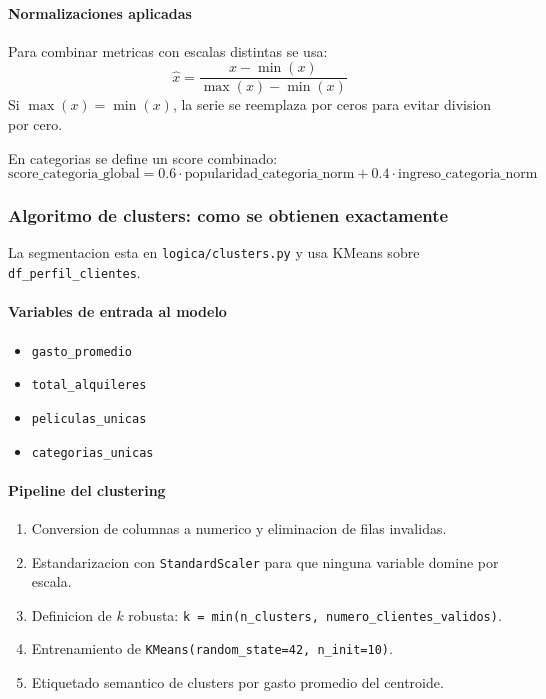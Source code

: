 ﻿\documentclass{article}
\begin{document}
\paragraph{Normalizaciones aplicadas}
Para combinar metricas con escalas distintas se usa:
\[
\hat{x}=\frac{x-\min(x)}{\max(x)-\min(x)}
\]
Si \(\max(x)=\min(x)\), la serie se reemplaza por ceros para evitar division por cero.

En categorias se define un score combinado:
\[
\text{score\_categoria\_global}=0.6\cdot\text{popularidad\_categoria\_norm}+0.4\cdot\text{ingreso\_categoria\_norm}
\]

\subsubsection{Algoritmo de clusters: como se obtienen exactamente}
La segmentacion esta en \texttt{logica/clusters.py} y usa KMeans sobre \texttt{df\_perfil\_clientes}.

\paragraph{Variables de entrada al modelo}
\begin{itemize}
    \item \texttt{gasto\_promedio}
    \item \texttt{total\_alquileres}
    \item \texttt{peliculas\_unicas}
    \item \texttt{categorias\_unicas}
\end{itemize}

\paragraph{Pipeline del clustering}
\begin{enumerate}
    \item Conversion de columnas a numerico y eliminacion de filas invalidas.
    \item Estandarizacion con \texttt{StandardScaler} para que ninguna variable domine por escala.
    \item Definicion de \(k\) robusta: \texttt{k = min(n\_clusters, numero\_clientes\_validos)}.
    \item Entrenamiento de \texttt{KMeans(random\_state=42, n\_init=10)}.
    \item Etiquetado semantico de clusters por gasto promedio del centroide.
\end{enumerate}
\end{document}
